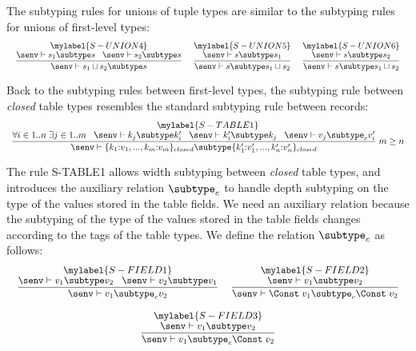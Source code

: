 The subtyping rules for unions of tuple types are similar to the
subtyping rules for unions of first-level types:
\[
\begin{array}{c}
\begin{array}{c}
\mylabel{S-UNION4}\\
\dfrac{\senv \vdash s_{1} \subtype s \;\;\;
       \senv \vdash s_{2} \subtype s}
      {\senv \vdash s_{1} \sqcup s_{2} \subtype s}
\end{array}
\;
\begin{array}{c}
\mylabel{S-UNION5}\\
\dfrac{\senv \vdash s \subtype s_{1}}
      {\senv \vdash s \subtype s_{1} \sqcup s_{2}}
\end{array}
\;
\begin{array}{c}
\mylabel{S-UNION6}\\
\dfrac{\senv \vdash s \subtype s_{2}}
      {\senv \vdash s \subtype s_{1} \sqcup s_{2}}
\end{array}
\end{array}
\]

Back to the subtyping rules between first-level types,
the subtyping rule between \emph{closed} table types resembles the
standard subtyping rule between records:
\[
\begin{array}{c}
\mylabel{S-TABLE1}\\
\dfrac{\forall i \in 1..n \; \exists j \in 1..m \;\;\;
       \senv \vdash k_{j} \subtype k_{i}' \;\;\;
       \senv \vdash k_{i}' \subtype k_{j} \;\;\;
       \senv \vdash v_{j} \subtype_{c} v_{i}'}
      {\senv \vdash \{k_{1}{:}v_{1}, ..., k_{m}{:}v_{m}\}_{closed} \subtype \{k_{1}'{:}v_{1}', ..., k_{n}'{:}v_{n}'\}_{closed}} \; m \ge n
\end{array}
\]

The rule \textsc{S-TABLE1} allows width subtyping between \emph{closed}
table types, and introduces the auxiliary relation $\subtype_{c}$ to
handle depth subtyping on the type of the values stored in the table fields.
We need an auxiliary relation because the subtyping of the
type of the values stored in the table fields changes according to
the tags of the table types.
We define the relation $\subtype_{c}$ as follows:
\[
\begin{array}{c}
\begin{array}{c}
\mylabel{S-FIELD1}\\
\dfrac{\senv \vdash v_{1} \subtype v_{2} \;\;\;
       \senv \vdash v_{2} \subtype v_{1}}
      {\senv \vdash v_{1} \subtype_{c} v_{2}}
\end{array}
\;
\begin{array}{c}
\mylabel{S-FIELD2}\\
\dfrac{\senv \vdash v_{1} \subtype v_{2}}
      {\senv \vdash \Const \; v_{1} \subtype_{c} \Const \; v_{2}}
\end{array}
\\ \\
\begin{array}{c}
\mylabel{S-FIELD3}\\
\dfrac{\senv \vdash v_{1} \subtype v_{2}}
      {\senv \vdash v_{1} \subtype_{c} \Const \; v_{2}}
\end{array}
\end{array}
\]

